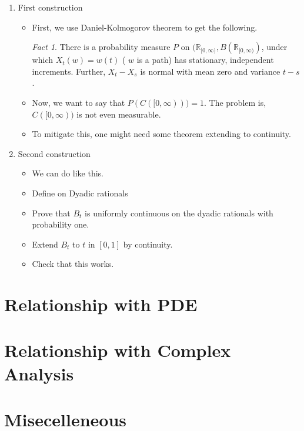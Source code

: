 \documentclass[11pt,reqno]{amsart}
\theoremstyle{remark}
\newtheorem{fact}{Fact}
\begin{document}
\begin{enumerate}
\item First construction
\begin{itemize}
\item First, we use Daniel-Kolmogorov theorem to get the following.
\begin{fact}
There is a probability measure \( P \) on \( (\mathbb{R}_{[0,\infty)}, B(\mathbb{R}_{[0,\infty)}) \), under which \( X_t(w) = w(t) \) ( \( w \) is a path) has stationary, independent increments. Further, \( X_t - X_s \) is normal with mean zero and variance \( t - s \).
\end{fact} 
\item Now, we want to say that \( P(C([0,\infty))) = 1 \). The problem is, \( C([0,\infty)) \) is not even measurable.
\item To mitigate this, one might need some theorem extending to continuity.
\end{itemize}

\item Second construction
\begin{itemize}
\item We can do like this.
\item Define on Dyadic rationals
\item Prove that \( B_t \) is uniformly continuous on the dyadic rationals with probability one.
\item Extend \( B_t \) to \( t \) in \( [0, 1] \) by continuity.
\item Check that this works.
  \end{itemize}
\end{enumerate}

\section{Relationship with PDE}

\section{Relationship with Complex Analysis}

\section{Misecelleneous}
\end{document}
